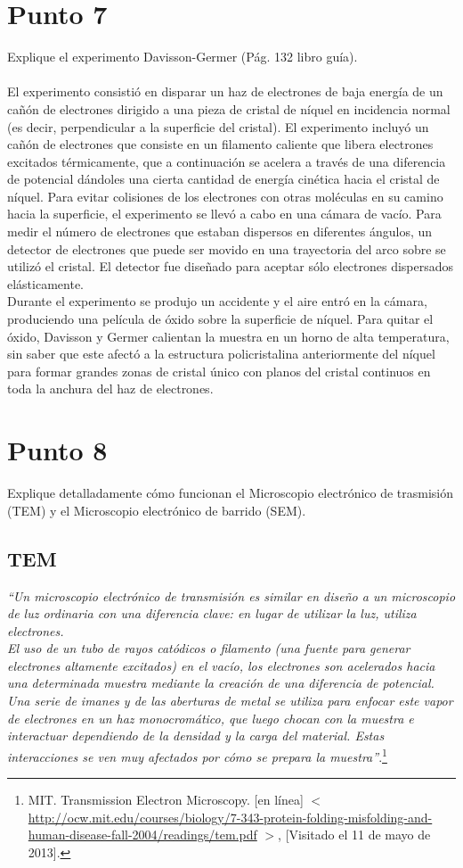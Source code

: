 \documentclass[11pt,graphicx,caption,rotating]{article}
\begin{document}
\section{Punto 7}
\noindent
Explique el experimento Davisson-Germer (Pág. 132 libro guía).\\\\
El experimento consistió en disparar un haz de electrones de baja energía de un cañón de electrones dirigido a una pieza de cristal de níquel en incidencia normal (es decir, perpendicular a la superficie del cristal). El experimento incluyó un cañón de electrones que consiste en un filamento caliente que libera electrones excitados térmicamente, que a continuación se acelera a través de una diferencia de potencial dándoles una cierta cantidad de energía cinética hacia el cristal de níquel. Para evitar colisiones de los electrones con otras moléculas en su camino hacia la superficie, el experimento se llevó a cabo en una cámara de vacío. Para medir el número de electrones que estaban dispersos en diferentes ángulos, un detector de electrones que puede ser movido en una trayectoria del arco sobre se utilizó el cristal. El detector fue diseñado para aceptar sólo electrones dispersados ​​elásticamente.\\
Durante el experimento se produjo un accidente y el aire entró en la cámara, produciendo una película de óxido sobre la superficie de níquel. Para quitar el óxido, Davisson y Germer calientan la muestra en un horno de alta temperatura, sin saber que este afectó a la estructura policristalina anteriormente del níquel para formar grandes zonas de cristal único con planos del cristal continuos en toda la anchura del haz de electrones.


\section{Punto 8}
\noindent
Explique detalladamente cómo funcionan el Microscopio electrónico de trasmisión (TEM) y el Microscopio electrónico de barrido (SEM).

\subsection{TEM}
\noindent
\textit{``Un microscopio electrónico de transmisión es similar en diseño a un microscopio de luz ordinaria con una diferencia clave: en lugar de utilizar la luz, utiliza electrones.\\
El uso de un tubo de rayos catódicos o filamento (una fuente para generar electrones altamente excitados) en el vacío, los electrones son acelerados hacia una determinada muestra mediante la creación de una diferencia de potencial. Una serie de imanes y de las aberturas de metal se utiliza para enfocar este vapor de electrones en un haz monocromático, que luego chocan con la muestra e interactuar dependiendo de la densidad y la carga del material. Estas interacciones se ven muy afectados por cómo se prepara la muestra''}.\footnote{\cite{page80} MIT. Transmission Electron Microscopy.  [en línea] $<$ \url{http://ocw.mit.edu/courses/biology/7-343-protein-folding-misfolding-and-human-disease-fall-2004/readings/tem.pdf} $>$, [Visitado el 11 de mayo de 2013].}
\end{document}
